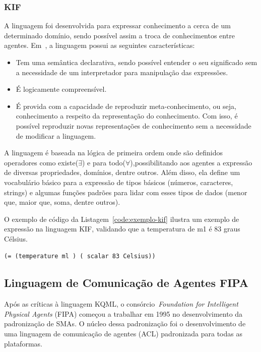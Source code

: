 \subsubsection{KIF}
A linguagem foi desenvolvida para expressar conhecimento a cerca de um determinado domínio, sendo possível assim a troca de conhecimentos entre agentes. Em~\cite{kifmanual}, a linguagem possui as seguintes características:
\begin{itemize}
	\item Tem uma semântica declarativa, sendo possível entender o seu significado sem a necessidade de um interpretador para manipulação das expressões.
	\item É logicamente compreensível.
	\item É provida com a capacidade de reproduzir meta-conhecimento, ou seja, conhecimento a respeito da representação do conhecimento. Com isso, é possível reproduzir novas representações de conhecimento sem a necessidade de modificar a linguagem.
\end{itemize}

A linguagem é baseada na lógica de primeira ordem onde são definidos operadores como existe($\exists$) e para todo($\forall$),possibilitando aos agentes a expressão de diversas propriedades, domínios, dentre outros. Além disso, ela define um vocabulário básico para a expressão de tipos básicos (números, caracteres, strings) e algumas funções padrões para lidar com esses tipos de dados (menor que, maior que, soma, dentre outros). 

O exemplo de código da Listagem~\ref{code:exemplo-kif} ilustra um exemplo de expressão na linguagem KIF, validando que a temperatura de m1 é 83 graus Célsius.

\begin{lstlisting}[label=code:exemplo-kif,caption=Exemplo de expressão de conteúdo com a linguagem KIF. Fonte:~\cite{wooldridge04}]
(= (temperature ml ) ( scalar 83 Celsius))
\end{lstlisting}

\subsection{Linguagem de Comunicação de Agentes FIPA}

Após as críticas à linguagem KQML, o consórcio~\emph{Foundation for Intelligent Physical Agents} (FIPA) começou a trabalhar em 1995 no desenvolvimento da padronização de SMAs. O núcleo dessa padronização foi o desenvolvimento de uma linguagem de comunicação de agentes (ACL) padronizada para todas as plataformas.

